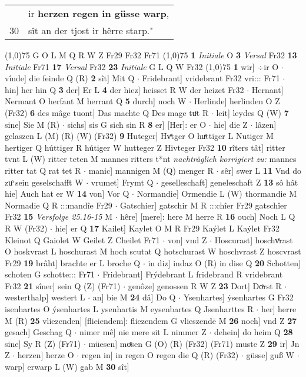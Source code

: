\documentclass[8pt,a4paper,notitlepage]{article}
\begin{document}
\begin{table}[ht]
\begin{minipage}[t]{0.5\linewidth}
\begin{tabular}{rl}
 & ir \textbf{herzen regen in güsse warp},\\ 
30 & sît an der tjost ir hêrre starp."\\ 
\end{tabular}
\scriptsize
\line(1,0){75} \newline
G O L M Q R W Z Fr29 Fr32 Fr71 \newline
\line(1,0){75} \newline
\textbf{1} \textit{Initiale} O  \textbf{3} \textit{Versal} Fr32  \textbf{13} \textit{Initiale} Fr71  \textbf{17} \textit{Versal} Fr32  \textbf{23} \textit{Initiale} G L Q W Fr32  \newline
\line(1,0){75} \newline
\textbf{1} wir] ÷ir O  $\cdot$ vînde] die feinde Q (R) \textbf{2} sît] Mit Q  $\cdot$ Fridebrant] vridebrant Fr32 vri::: Fr71  $\cdot$ hin] her hin Q \textbf{3} der] Er L \textbf{4} der hiez] heisset R W der heizet Fr32  $\cdot$ Hernant] Nermant O herfant M herrant Q \textbf{5} durch] noch W  $\cdot$ Herlinde] herlinden O Z (Fr32) \textbf{6} des mâge tuont] Das machte Q Des mage tuͦt R  $\cdot$ leit] leydes Q (W) \textbf{7} sine] Sie M (R)  $\cdot$ sichs] sis G sich sin R \textbf{8} er] [Her]: er O  $\cdot$ hie] die Z  $\cdot$ lâzen] gelaszen L (M) (R) (W) (Fr32) \textbf{9} Huteger] Hvͦtger O huͯttiger L Nutiger M hertiger Q húttiger R hútiger W hutteger Z Hivteger Fr32 \textbf{10} rîters tât] ritter tvnt L (W) ritter teten M mannes ritters t*nt \textit{nachträglich korrigiert zu:} mannes ritter tat Q rat tet R  $\cdot$ manic] mannigen M (Q) menger R  $\cdot$ sêr] swer L \textbf{11} Vnd do zuͦ sein geselschafft W  $\cdot$ vrumet] Frymt Q  $\cdot$ geselleschaft] geneleschaft Z \textbf{13} sô hât hie] Auch hat er W \textbf{14} von] Vor Q  $\cdot$ Normandie] Ormendie L (W) thormandie M Normadie Q R :::mandîe Fr29  $\cdot$ Gatschier] gatschir M R :::chîer Fr29 gatschîer Fr32 \textbf{15} \textit{Versfolge 25.16-15} M   $\cdot$ hêre] [mere]: here M herre R \textbf{16} ouch] Noch L Q R W (Fr32)  $\cdot$ hie] er Q \textbf{17} Kailet] Kaylet O M R Fr29 Kaýlet L Kaẏlet Fr32 Kleinot Q Gaiolet W Geilet Z Cheilet Fr71  $\cdot$ von] vnd Z  $\cdot$ Hoscurast] hoschvͦrast O hoskvrast L hoschurast M hoch scutat Q hotschurast W hoschvrast Z hoscvrast Fr29 \textbf{19} brâht] brachte er L broche Q  $\cdot$ in diz] indaz O (R) in dise Q \textbf{20} Schotten] schoten G schotte::: Fr71  $\cdot$ Fridebrant] Frýdebrant L fridebrand R vridebrant Fr32 \textbf{21} sîner] sein Q (Z) (Fr71)  $\cdot$ genôze] genossen R W Z \textbf{23} Dort] Doͯrst R  $\cdot$ westerthalp] westert L  $\cdot$ an] bie M \textbf{24} dâ] Do Q  $\cdot$ Ysenhartes] ẏsenhartes G Fr32 isenhartes O ýsenhartes L ysenhartis M eysenbartes Q Jsenharttes R  $\cdot$ her] herre M (R) \textbf{25} vliezenden] [flieiendem]: fliezendem G vlieszendē M \textbf{26} noch] vnd Z \textbf{27} gesach] Geschag Q  $\cdot$ nimer mê] nie mere sit L nimmer Z  $\cdot$ dehein] do heim Q \textbf{28} sine] Sy R (Z) (Fr71)  $\cdot$ müesen] moͮsen G (O) (R) (Fr32) (Fr71) muste Z \textbf{29} ir] Jn Z  $\cdot$ herzen] herze O  $\cdot$ regen in] in regen O regen die Q (R) (Fr32)  $\cdot$ güsse] guß W  $\cdot$ warp] erwarp L (W) gab M \textbf{30} sît] 
\end{minipage}
\end{table}
\end{document}
